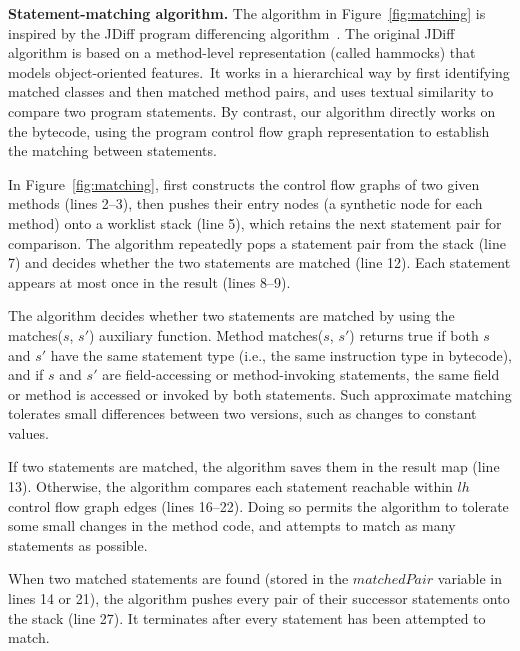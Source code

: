 \vspace{1mm}
\noindent \textbf{Statement-matching algorithm.}
The algorithm in Figure~\ref{fig:matching} is inspired by
the JDiff program differencing algorithm~\cite{Apiwattanapong:2004}. The original JDiff
algorithm is based on a method-level representation
(called hammocks) that models object-oriented features.\
It works in a hierarchical way by first identifying matched
classes and then matched method pairs, and uses
textual similarity to compare two program statements. By contrast, our
algorithm directly works on the bytecode, using the program control flow graph
representation to establish the matching between statements.

In Figure~\ref{fig:matching}, \ourtool first constructs the control
flow graphs of two given methods (lines 2--3), then pushes their
entry nodes (a synthetic node for each method) onto a worklist stack (line 5), which retains
the next statement pair for comparison. The algorithm repeatedly
pops a statement pair from the stack (line 7) and
decides whether the two statements are matched (line 12).  
Each statement appears at most once in the result (lines 8--9).

The algorithm decides whether two statements are matched by using
the matches($\mathit{s}$, $\mathit{s'}$) auxiliary function. Method
matches($\mathit{s}$, $\mathit{s'}$) returns true if both
$\mathit{s}$ and $\mathit{s'}$ have the same statement type (i.e.,
the same instruction type in bytecode), and if $\mathit{s}$ and
$\mathit{s'}$ are field-accessing or method-invoking statements,
the same field or method is accessed or invoked
by both statements.
Such approximate matching
tolerates small differences
between two versions, such as changes to constant values.


If two statements are matched, the algorithm saves them in the
result map (line 13). Otherwise,
the algorithm compares each statement reachable within $lh$
control flow graph edges (lines 16--22). Doing so permits the algorithm to tolerate some small
changes in the method code, and attempts to match as many statements as possible.

When two matched statements are found  (stored in
the $\mathit{matchedPair}$ variable in lines 14 or 21),
the algorithm pushes every pair of
their successor statements onto the stack (line 27).
It terminates after every statement has been attempted to match.


